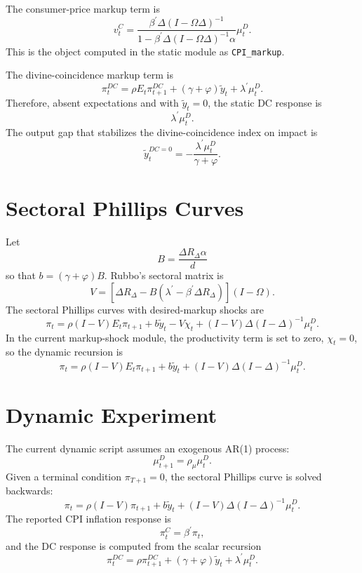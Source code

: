 \documentclass[11pt]{article}
\begin{document}
The consumer-price markup term is
\[
    v_t^C
    =
    \frac{
        \beta^\prime \Delta (I-\Omega\Delta)^{-1}
    }{
        1-\beta^\prime \Delta (I-\Omega\Delta)^{-1}\alpha
    }
    \mu_t^D.
\]
This is the object computed in the static module as \texttt{CPI\_markup}.

The divine-coincidence markup term is
\[
    \pi_t^{DC}
    =
    \rho E_t \pi_{t+1}^{DC}
    +(\gamma+\varphi)\tilde y_t
    + \lambda^\prime \mu_t^D.
\]
Therefore, absent expectations and with $\tilde y_t=0$, the static DC response is
\[
    \lambda^\prime \mu_t^D.
\]
The output gap that stabilizes the divine-coincidence index on impact is
\[
    \tilde y_t^{DC=0}
    =
    -\frac{\lambda^\prime \mu_t^D}{\gamma+\varphi}.
\]

\section{Sectoral Phillips Curves}

Let
\[
    B =
    \frac{\Delta R_\Delta \alpha}{d}
\]
so that $b=(\gamma+\varphi)B$. Rubbo's sectoral matrix is
\[
V
=
    \left[
        \Delta R_\Delta
        -
        B
        \left(
            \lambda^\prime
            -
            \beta^\prime \Delta R_\Delta
        \right)
    \right]
    (I-\Omega).
\]
The sectoral Phillips curves with desired-markup shocks are
\[
    \pi_t
    =
    \rho (I-V)E_t\pi_{t+1}
    +
    b \tilde y_t
    -
    V\chi_t
    +
    (I-V)\Delta(I-\Delta)^{-1}\mu_t^D.
\]
In the current markup-shock module, the productivity term is set to zero,
$\chi_t=0$, so the dynamic recursion is
\[
    \pi_t
    =
    \rho (I-V)E_t\pi_{t+1}
    +
    b \tilde y_t
    +
    (I-V)\Delta(I-\Delta)^{-1}\mu_t^D.
\]

\section{Dynamic Experiment}

The current dynamic script assumes an exogenous AR(1) process:
\[
    \mu_{t+1}^D = \rho_\mu \mu_t^D.
\]
Given a terminal condition $\pi_{T+1}=0$, the sectoral Phillips curve is solved
backwards:
\[
    \pi_t
    =
    \rho (I-V)\pi_{t+1}
    +
    b\tilde y_t
    +
    (I-V)\Delta(I-\Delta)^{-1}\mu_t^D.
\]
The reported CPI inflation response is
\[
    \pi_t^C = \beta^\prime \pi_t,
\]
and the DC response is computed from the scalar recursion
\[
    \pi_t^{DC}
    =
    \rho \pi_{t+1}^{DC}
    +
    (\gamma+\varphi)\tilde y_t
    +
    \lambda^\prime \mu_t^D.
\]
\end{document}
